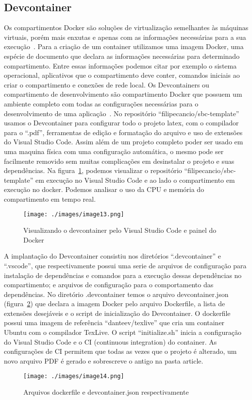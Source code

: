 

\subsection{Devcontainer}
Os compartimentos Docker são soluções de virtualização semelhantes às máquinas virtuais, porém mais enxutas e apenas com as informações necessárias para a sua execução~\cite{vitalino:01}. Para a criação de um container utilizamos uma imagem Docker, uma espécie de documento que declara as informações necessárias para determinado compartimento. Entre essas informações podemos citar por exemplo o sistema operacional, aplicativos que o compartimento deve conter, comandos iniciais ao criar o compartimento e conexões de rede local.
Os Devcontainers ou compartimento de desenvolvimento são compartimento Docker que possuem um ambiente completo com todas as configurações necessárias para o desenvolvimento de uma aplicação~\cite{github:01}. No repositório ``filipecancio/sbc-template'' usamos o Devcontainer para configurar todo o projeto latex, com o compilador para o ``.pdf'', ferramentas de edição e formatação do arquivo e uso de extensões do Visual Studio Code. Assim além de um projeto completo poder ser usado em uma maquina física com uma configuração automática, o mesmo pode ser facilmente removido sem muitas complicações em desinstalar o projeto e suas dependências.
Na figura~\ref{fig:image13}, podemos visualizar o repositório ``filipecancio/sbc-template'' em execução no Visual Studio Code e ao lado o compartimento em execução no docker. Podemos analisar o uso da CPU e memória do compartimento em tempo real.

\begin{figure}[ht]
	\centering
	\texttt{[image: ./images/image13.png]}
	\caption{Visualizando o devcontainer pelo Visual Studio Code e painel do Docker}
	\label{fig:image13}
\end{figure}

A implantação do Devcontainer consistiu nos diretórios ``.devcontainer'' e ``.vscode'', que respectivamente possui uma serie de arquivos de configuração para instalação de dependências e comandos para a execução dessas dependências no compartimento; e arquivos de configuração para o comportamento das dependências.
No diretório .devcontainer temos o arquivo devcontainer.json (figura~\ref{fig:image14}) que declara a imagem Docker pelo arquivo Dockerfile, a lista de extensões desejáveis e o script de inicialização do Devcontainer. O dockerfile possui uma imagem de referência ``danteev/texlive'' que cria um container Ubuntu com o compilador TexLive. O script ``initialize.sh'' inicia a configuração do Visual Studio Code e o CI (continuous integration) do container. As configurações de CI permitem que todas as vezes que o projeto é alterado, um novo arquivo PDF é gerado e sobrescreve o antigo na pasta article.

\begin{figure}[ht]
	\centering
	\texttt{[image: ./images/image14.png]}
	\caption{Arquivos dockerfile e devcontainer.json respectivamente}
	\label{fig:image14}
\end{figure}


